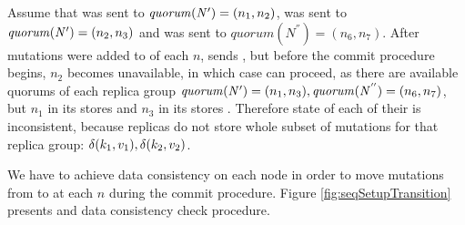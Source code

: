 Assume that  was sent to $\mathit{quorum}(\text{$\mathit{N'}$})=(n_1, n_2)$,  was sent to $\mathit{quorum}(\text{$\mathit{N'}$})=(n_2, n_3)$ and
 was sent to $\mathit{quorum}(\mathit{N^{''}})=(n_6, n_7)$.
 After mutations were added to \txStorage of each $n$, \client sends \txCommitMessage, but before the commit procedure begins, $n_2$ becomes unavailable, in which case  can proceed, as there are available quorums of each replica group 
 $\mathit{quorum}(\text{$\mathit{N'}$})=(n_1,n_3), \mathit{quorum}(\mathit{N^{''}})=(n_6,n_7)$, 
 but $n_1$ in its \txStorage stores  and $n_3$ in its \txStorage stores . Therefore state of each of their \txStorage is inconsistent, because replicas do not store whole subset of mutations for that replica group: $\text{$\delta(k_1, v_1)$}, \text{$\delta(k_2, v_2)$}$.

We have to achieve data consistency on each node in order to move mutations from \txStorage to \database at each $n$ during the commit procedure. Figure \ref{fig:seqSetupTransition} presents \setupTransition and data consistency check procedure.









